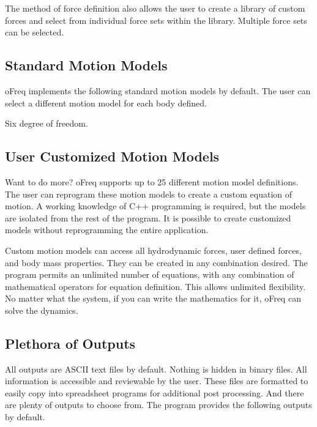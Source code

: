 The method of force definition also allows the user to create a library of custom forces and select from individual force sets within the library. Multiple force sets can be selected.

\subsection*{Standard Motion Models}

o\-Freq implements the following standard motion models by default. The user can select a different motion model for each body defined.


\begin{DoxyItemize}
\item Six degree of freedom.
\end{DoxyItemize}

\subsection*{User Customized Motion Models}

Want to do more? o\-Freq supports up to 25 different motion model definitions. The user can reprogram these motion models to create a custom equation of motion. A working knowledge of C++ programming is required, but the models are isolated from the rest of the program. It is possible to create customized models without reprogramming the entire application.

Custom motion models can access all hydrodynamic forces, user defined forces, and body mass properties. They can be created in any combination desired. The program permits an unlimited number of equations, with any combination of mathematical operators for equation definition. This allows unlimited flexibility. No matter what the system, if you can write the mathematics for it, o\-Freq can solve the dynamics.

\subsection*{Plethora of Outputs}

All outputs are A\-S\-C\-I\-I text files by default. Nothing is hidden in binary files. All information is accessible and reviewable by the user. These files are formatted to easily copy into spreadsheet programs for additional post processing. And there are plenty of outputs to choose from. The program provides the following outputs by default.


